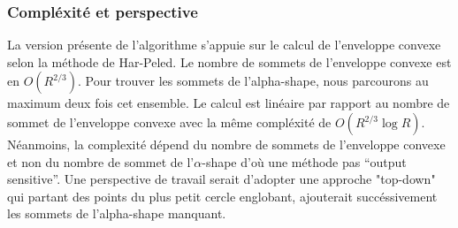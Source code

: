 \subsubsection{Compléxité et perspective}

La version présente de l'algorithme s'appuie sur le calcul de l'enveloppe convexe selon la méthode de Har-Peled. Le nombre de sommets de l'enveloppe convexe est en $O(R^{2/3})$. Pour trouver les sommets de l'alpha-shape, nous parcourons au maximum deux fois cet ensemble. Le calcul est linéaire par rapport au nombre de sommet de l'enveloppe convexe avec la même compléxité de $O(R^{2/3} \log R )$. Néanmoins, la complexité dépend du nombre de sommets de l'enveloppe convexe et non du nombre de sommet de l'$\alpha$-shape d'où une méthode pas ``output sensitive''. Une perspective de travail serait d'adopter une approche "top-down" qui partant des points du plus petit cercle englobant, ajouterait succéssivement les sommets de l'alpha-shape manquant. 
